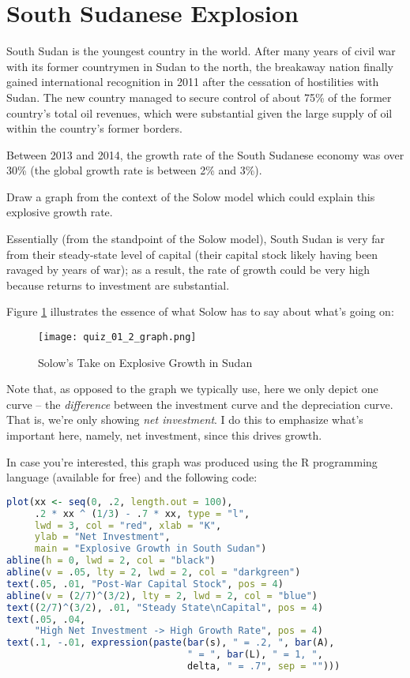 \documentclass{article}
\begin{document}
\section{South Sudanese Explosion}

South Sudan is the youngest country in the world. After many years of civil war with its former countrymen in Sudan to the north, the breakaway nation finally gained international recognition in 2011 after the cessation of hostilities with Sudan. The new country managed to secure control of about 75\% of the former country's total oil revenues, which were substantial given the large supply of oil within the country's former borders.

Between 2013 and 2014, the growth rate of the South Sudanese economy was over 30\% (the global growth rate is between 2\% and 3\%).

Draw a graph from the context of the Solow model which could explain this explosive growth rate.

\color{red}

Essentially (from the standpoint of the Solow model), South Sudan is very far from their steady-state level of capital (their capital stock likely having been ravaged by years of war); as a result, the rate of growth could be very high because returns to investment are substantial. 

Figure \ref{sudan} illustrates the essence of what Solow has to say about what's going on:

\begin{figure}[htbp]
\centering
\texttt{[image: quiz\_01\_2\_graph.png]}
\caption{Solow's Take on Explosive Growth in Sudan}
\label{sudan}
\end{figure}

Note that, as opposed to the graph we typically use, here we only depict one curve -- the \textit{difference} between the investment curve and the depreciation curve. That is, we're only showing \textit{net investment}. I do this to emphasize what's important here, namely, net investment, since this drives growth.

In case you're interested, this graph was produced using the R programming language (available for free) and the following code:

\begin{lstlisting}[language=R, backgroundcolor=\color{Aquamarine}, showstringspaces=false]
plot(xx <- seq(0, .2, length.out = 100),
     .2 * xx ^ (1/3) - .7 * xx, type = "l",
     lwd = 3, col = "red", xlab = "K",
     ylab = "Net Investment",
     main = "Explosive Growth in South Sudan")
abline(h = 0, lwd = 2, col = "black")
abline(v = .05, lty = 2, lwd = 2, col = "darkgreen")
text(.05, .01, "Post-War Capital Stock", pos = 4)
abline(v = (2/7)^(3/2), lty = 2, lwd = 2, col = "blue")
text((2/7)^(3/2), .01, "Steady State\nCapital", pos = 4)
text(.05, .04, 
	 "High Net Investment -> High Growth Rate", pos = 4)
text(.1, -.01, expression(paste(bar(s), " = .2, ", bar(A),
                                " = ", bar(L), " = 1, ", 
                                delta, " = .7", sep = "")))
\end{lstlisting}
\end{document}
